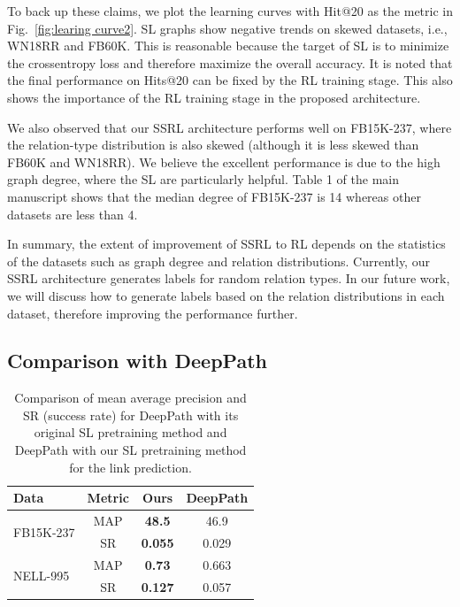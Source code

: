 \documentclass[lettersize,journal]{IEEEtran}
\begin{document}
To back up these claims, we plot the learning curves with Hit@20 as the metric in Fig.~\ref{fig:learing curve2}. SL graphs show negative trends on skewed datasets, i.e., WN18RR and FB60K. This is reasonable because the target of SL is to minimize the crossentropy loss and therefore maximize the overall accuracy. It is noted that the final performance on Hits@20 can be fixed by the RL training stage. This also shows the importance of the RL training stage in the proposed architecture.

We also observed that our SSRL architecture performs well on FB15K-237, where the relation-type distribution is also skewed (although it is less skewed than FB60K and WN18RR). We believe the excellent performance is due to the high graph degree, where the SL are particularly helpful. Table 1 of the main manuscript shows that the median degree of FB15K-237 is 14 whereas other datasets are less than 4.

In summary, the extent of improvement of SSRL to RL depends on the statistics of the datasets such as graph degree and relation distributions. Currently, our SSRL architecture generates labels for random relation types. In our future work, we will discuss how to generate labels based on the relation distributions in each dataset, therefore improving the performance further.

\subsection{Comparison with DeepPath}
\label{deeppath comp}
\begin{table}
\centering
\caption{Comparison of mean average precision and SR (success rate) for DeepPath with its original SL pretraining method and DeepPath with our SL pretraining method for the link prediction.
}
\begin{tabular}{lccc}
\hline
Data &Metric &Ours&DeepPath\\
\hline
\multirow{2}{5em}{FB15K-237} & MAP &\textbf{48.5}&46.9\\
& SR &\textbf{0.055}&0.029\\

\hline
\multirow{2}{5em}{NELL-995} & MAP &\textbf{0.73} &0.663\\
& SR&\textbf{0.127} &0.057 \\

\hline

\end{tabular}

\label{performance comp with deeppath}
\end{table}
\end{document}
